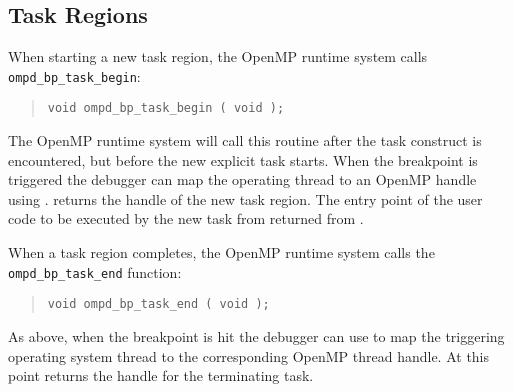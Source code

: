 \subsection{Task Regions}

When starting a new task region, the OpenMP runtime system
calls \texttt{ompd\_bp\_task\_begin}:
\begin{quote}
\begin{lstlisting}
void ompd_bp_task_begin ( void );
\end{lstlisting}
\end{quote}
The OpenMP runtime system will call this routine after the task
construct is encountered, but before the new explicit task starts.
When the breakpoint is triggered the debugger can map the operating
thread to an OpenMP handle using
.
returns the handle of the new task region.
The entry point of the user code to be executed by the new task
from returned from
.

When a task region completes, the OpenMP runtime system
calls the \texttt{ompd\_bp\_task\_end} function:
\begin{quote}
\begin{lstlisting}
void ompd_bp_task_end ( void );
\end{lstlisting}
\end{quote}
As above, when the breakpoint is hit the debugger can use
to map the triggering operating system thread to the corresponding
OpenMP thread handle.
At this point
returns the handle for the terminating task.